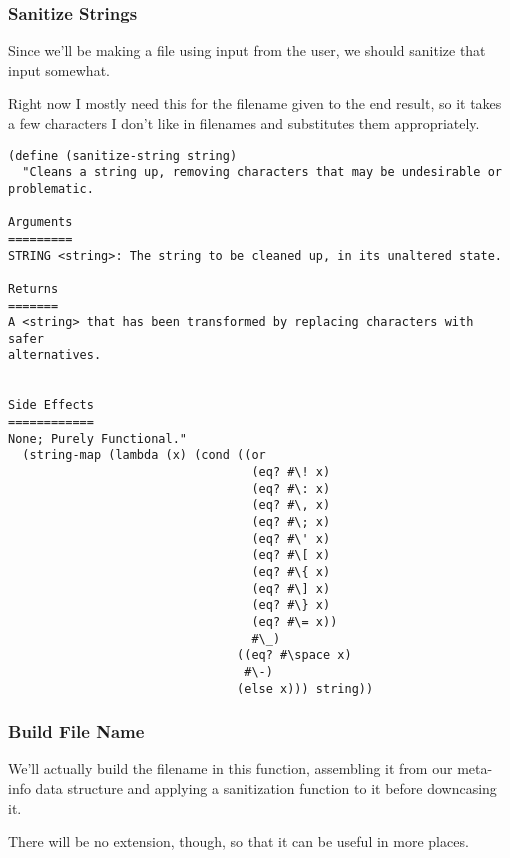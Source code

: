 \documentclass[11pt]{article}
\begin{document}
\subsubsection{Sanitize Strings}
\label{sec:org9ac8af0}
Since we'll be making a file using input from the user, we should sanitize that
input somewhat.

Right now I mostly need this for the filename given to the end result, so it
takes a few characters I don't like in filenames and substitutes them
appropriately.

\begin{verbatim}
(define (sanitize-string string)
  "Cleans a string up, removing characters that may be undesirable or problematic.

Arguments
=========
STRING <string>: The string to be cleaned up, in its unaltered state.

Returns
=======
A <string> that has been transformed by replacing characters with safer 
alternatives.


Side Effects
============
None; Purely Functional."
  (string-map (lambda (x) (cond ((or
                                  (eq? #\! x)
                                  (eq? #\: x)
                                  (eq? #\, x)
                                  (eq? #\; x)
                                  (eq? #\' x)
                                  (eq? #\[ x)
                                  (eq? #\{ x)
                                  (eq? #\] x)
                                  (eq? #\} x)
                                  (eq? #\= x))
                                  #\_)
                                ((eq? #\space x)
                                 #\-)
                                (else x))) string))
\end{verbatim}

\subsubsection{Build File Name}
\label{sec:org52773d7}
We'll actually build the filename in this function, assembling it from our
meta-info data structure and applying a sanitization function to it before
downcasing it.

There will be no extension, though, so that it can be useful in more places.
\end{document}
